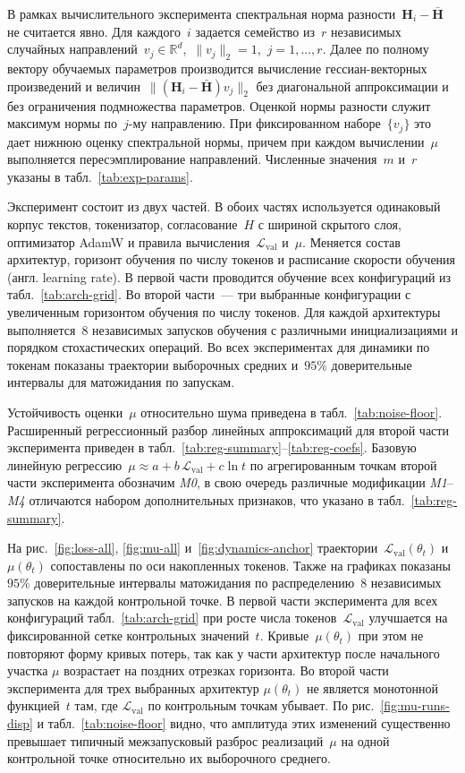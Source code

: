 \documentclass[11pt]{ubs}
\begin{document}
В рамках вычислительного эксперимента спектральная норма разности~$\mathbf{H}_i-\bar{\mathbf{H}}$ не считается явно. Для каждого~$i$ задается семейство из~$r$ независимых случайных направлений~$v_j\in\mathbb{R}^d$,~$\|v_j\|_2=1$,~$j=1,\ldots,r$.
Далее по полному вектору обучаемых параметров производится вычисление гессиан-векторных произведений и величин~$\|(\mathbf{H}_i-\bar{\mathbf{H}})v_j\|_2$ без диагональной аппроксимации и без ограничения подмножества параметров.
Оценкой нормы разности служит максимум нормы по~$j$-му направлению.
При фиксированном наборе~$\{v_j\}$ это дает нижнюю оценку спектральной нормы, причем при каждом вычислении~$\mu$ выполняется пересэмплирование направлений.
Численные значения~$m$ и~$r$ указаны в табл.~\ref{tab:exp-params}.

Эксперимент состоит из двух частей.
В обоих частях используется одинаковый корпус текстов, токенизатор, согласование~$H$ с шириной скрытого слоя, оптимизатор AdamW и правила вычисления~$\mathcal{L}_{\mathrm{val}}$ и~$\mu$.
Меняется состав архитектур, горизонт обучения по числу токенов и расписание скорости обучения (англ. learning rate).
В первой части проводится обучение всех конфигураций из табл.~\ref{tab:arch-grid}.
Во второй части~--- три выбранные конфигурации с увеличенным горизонтом обучения по числу токенов.
Для каждой архитектуры выполняется~$8$ независимых запусков обучения с различными инициализациями и порядком стохастических операций.
Во всех экспериментах для динамики по токенам показаны траектории выборочных средних и~$95\%$ доверительные интервалы для матожидания по запускам.

Устойчивость оценки~$\mu$ относительно шума приведена в табл.~\ref{tab:noise-floor}.
Расширенный регрессионный разбор линейных аппроксимаций для второй части эксперимента приведен в табл.~\ref{tab:reg-summary}--\ref{tab:reg-coefs}.
Базовую линейную регрессию~$\mu\approx a+b\,\mathcal{L}_{\mathrm{val}}+c\ln t$ по агрегированным точкам второй части эксперимента обозначим \emph{M0}, в свою очередь различные модификации \emph{M1}--\emph{M4} отличаются набором дополнительных признаков, что указано в табл.~\ref{tab:reg-summary}.

На рис.~\ref{fig:loss-all}, \ref{fig:mu-all} и~\ref{fig:dynamics-anchor} траектории~$\mathcal{L}_{\mathrm{val}}(\theta_t)$ и~$\mu(\theta_t)$ сопоставлены по оси накопленных токенов.
Также на графиках показаны~$95\%$ доверительные интервалы матожидания по распределению~$8$ независимых запусков на каждой контрольной точке.
В первой части эксперимента для всех конфигураций табл.~\ref{tab:arch-grid} при росте числа токенов~$\mathcal{L}_{\mathrm{val}}$ улучшается на фиксированной сетке контрольных значений~$t$.
Кривые~$\mu(\theta_t)$ при этом не повторяют форму кривых потерь, так как у части архитектур после начального участка $\mu$ возрастает на поздних отрезках горизонта.
Во второй части эксперимента для трех выбранных архитектур $\mu(\theta_t)$ не является монотонной функцией~$t$ там, где $\mathcal{L}_{\mathrm{val}}$ по контрольным точкам убывает.
По рис.~\ref{fig:mu-runs-disp} и табл.~\ref{tab:noise-floor} видно, что амплитуда этих изменений существенно превышает типичный межзапусковый разброс реализаций~$\mu$ на одной контрольной точке относительно их выборочного среднего.
\end{document}

